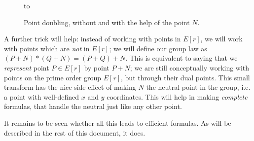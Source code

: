 \documentclass{llncs}
\begin{document}
\begin{figure}
\begin{center}
    \hbox to
\end{center}
\caption{\label{fig:curve5-double}Point doubling, without and with the help of the point $N$.}
\end{figure}

A further trick will help: instead of working with points in $E[r]$, we
will work with points which are \emph{not} in $E[r]$; we will define our
group law as $(P+N)*(Q+N) = (P+Q)+N$. This is equivalent to saying that
we \emph{represent} point $P \in E[r]$ by point $P+N$; we are still
conceptually working with points on the prime order group $E[r]$, but
through their dual points. This small transform has the nice side-effect
of making $N$ the neutral point in the group, i.e. a point with
well-defined $x$ and $y$ coordinates. This will help in making
\emph{complete} formulas, that handle the neutral just like any other
point.

It remains to be seen whether all this leads to efficient formulas. As
will be described in the rest of this document, it does.
\end{document}

